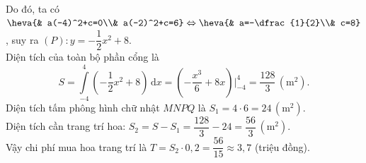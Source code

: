 \begin{ex}
{Do đó, ta có $\heva{& a(-4)^2+c=0\\& a(-2)^2+c=6} \Leftrightarrow \heva{& a=-\dfrac{1}{2}\\& c=8}$,
suy ra $(P)\colon y=-\dfrac{1}{2}x^2+8$.\\
Diện tích của toàn bộ phần cổng là
\[S=\displaystyle\int\limits_{-4}^{4} \left(-\dfrac{1}{2}x^2+8\right) \mathrm{\,d}x = \left(-\dfrac{x^3}{6}+8x\right)\Bigg|_{-4}^4 = \dfrac{128}{3}\, \left(\text{m}^2\right).\]
Diện tích tấm phông hình chữ nhật $MNPQ$ là $S_1 = 4\cdot 6 =24\, \left(\text{m}^2\right)$.\\
Diện tích cần trang trí hoa: $S_2 = S-S_1=\dfrac{128}{3}-24 =\dfrac{56}{3}\, \left(\text{m}^2\right)$.\\
Vậy chi phí mua hoa trang trí là $T=S_2\cdot 0{,}2 = \dfrac{56}{15} \approx 3{,}7$ (triệu đồng).
}
\end{ex}

